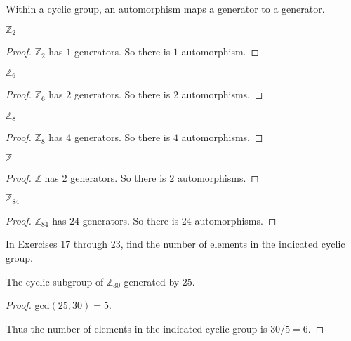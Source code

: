 Within a cyclic group, an automorphism maps a generator to a generator.

\begin{exercise}
    $\mathbb{Z}_{2}$
\end{exercise}

\begin{proof}
    $\mathbb{Z}_{2}$ has $1$ generators. So there is $1$ automorphism.
\end{proof}

\begin{exercise}
    $\mathbb{Z}_{6}$
\end{exercise}

\begin{proof}
    $\mathbb{Z}_{6}$ has $2$ generators. So there is $2$ automorphisms.
\end{proof}

\begin{exercise}
    $\mathbb{Z}_{8}$
\end{exercise}

\begin{proof}
    $\mathbb{Z}_{8}$ has $4$ generators. So there is $4$ automorphisms.
\end{proof}

\begin{exercise}
    $\mathbb{Z}$
\end{exercise}

\begin{proof}
    $\mathbb{Z}$ has $2$ generators. So there is $2$ automorphisms.
\end{proof}

\begin{exercise}
    $\mathbb{Z}_{84}$
\end{exercise}

\begin{proof}
    $\mathbb{Z}_{84}$ has $24$ generators. So there is $24$ automorphisms.
\end{proof}

In Exercises 17 through 23, find the number of elements in the indicated cyclic group.

\begin{exercise}
    The cyclic subgroup of $\mathbb{Z}_{30}$ generated by $25$.
\end{exercise}

\begin{proof}
    $\text{gcd}(25, 30) = 5$.

    Thus the number of elements in the indicated cyclic group is $30/5 = 6$.
\end{proof}

